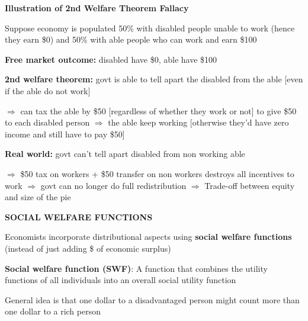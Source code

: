 \documentclass[landscape]{slides}
\begin{document}
\begin{slide}
\begin{center}
{\bf Illustration of 2nd Welfare Theorem Fallacy}
\end{center}
Suppose economy is populated 50\% with disabled people unable to work (hence they earn \$0) and 50\% with able people
who can work and earn \$100

\textbf{Free market outcome:} disabled have \$0, able have \$100

\textbf{2nd welfare theorem:} govt is able to tell apart the disabled from the able [even if the able do not work] 

\small
$\Rightarrow$
can tax the able by \$50 [regardless of whether they work or not] to give \$50 to each disabled person $\Rightarrow$ the able keep working [otherwise they'd have zero income and still have to pay \$50]

\normalsize 
 
\textbf{Real world:} govt can't tell apart disabled from non working able

\small
$\Rightarrow$ \$50 tax on workers + \$50 transfer on non workers destroys all incentives to work $\Rightarrow$ govt can no longer do full redistribution $\Rightarrow$ Trade-off between equity and size of the pie

\small



\end{slide}

\begin{slide}
\begin{center}
{\bf SOCIAL WELFARE FUNCTIONS}
\end{center}

Economists incorporate distributional aspects using \textbf{social welfare functions} (instead of just adding
\$ of economic surplus)

{\bf Social welfare function (SWF)}:
A function that combines the utility functions of all individuals into an overall social utility function


General idea is that one dollar to a disadvantaged person might count more than one dollar to a rich person

\end{slide}
\end{document}

